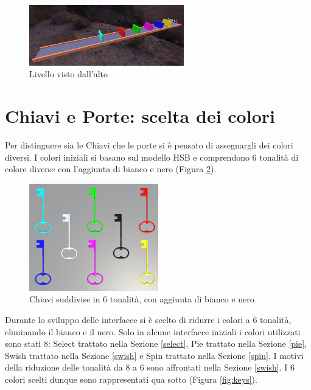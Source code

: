 \documentclass[target=bach,aauheader=]{thud}
\begin{document}
\begin{figure}[h]
    \centering
    \includegraphics[width=0.60\textwidth]{level}
    \caption{Livello visto dall'alto}
    \label{fig:level}
\end{figure}

\section{Chiavi e Porte: scelta dei colori}
\label{keys}
Per distinguere sia le Chiavi che le porte si è pensato di assegnargli dei colori diversi.
I colori iniziali si basano sul modello HSB e comprendono 6 tonalità di colore diverse con l'aggiunta di bianco e nero (Figura \ref{fig:keys2}).

\begin{figure}[h]
    \centering
    \includegraphics[width=0.50\textwidth]{keys2}
    \caption{Chiavi suddivise in 6 tonalità, con aggiunta di bianco e nero}
    \label{fig:keys2}
\end{figure}
Durante lo sviluppo delle interfacce si è scelto di ridurre i colori a 6 tonalità, eliminando il bianco e il nero.
Solo in alcune interfacce iniziali i colori utilizzati sono stati 8: Select trattato nella Sezione \ref{select}, Pie trattato nella Sezione \ref{pie}, Swish trattato nella Sezione \ref{swish} e Spin trattato nella Sezione \ref{spin}. %
I motivi della riduzione delle tonalità da 8 a 6 sono affrontati nella Sezione \ref{swish}. %
I 6 colori scelti dunque sono rappresentati qua sotto (Figura \ref{fig:keys}). \\
\end{document}
